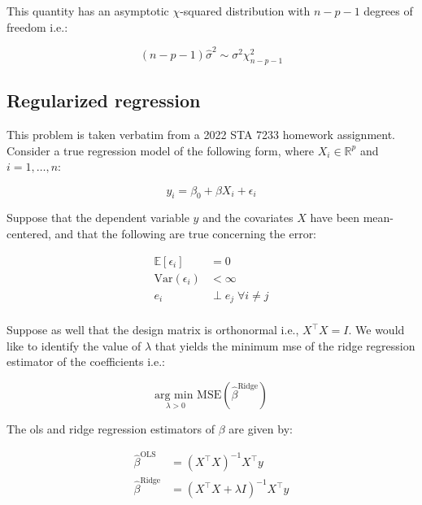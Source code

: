 \documentclass{report}
\begin{document}
This quantity has an asymptotic $\chi$-squared distribution with $n - p - 1$ degrees of freedom i.e.:

\begin{equation}\label{eq:ex-ols-sigma-squared-unbiased-asymptotics}
    (n - p - 1)\hat{\sigma}^2 \sim \sigma^2\chi^2_{n-p-1}
\end{equation}

\subsection{Regularized regression}

This problem is taken verbatim from a 2022 STA 7233 homework assignment. Consider a true regression model of the following form, where $X_i \in \mathbb{R}^p$ and $i = 1, \dots, n$:

\begin{equation}\label{eq:ex-ridge-model-form}
    y_i = \beta_0 + \beta X_i + \epsilon_i
\end{equation}

Suppose that the dependent variable $y$ and the covariates $X$ have been mean-centered, and that the following are true concerning the error:

\begin{equation}\label{eq:ex-ridge-model-assumptions}
    \begin{aligned}
        \mathbb{E}[\epsilon_i] &= 0 \\
        \text{Var}(\epsilon_i) &< \infty \\
        e_i &\perp e_j\; \forall i \neq j \\
    \end{aligned}
\end{equation}

Suppose as well that the design matrix is orthonormal i.e., $X^\intercal X = I$. We would like to identify the value of $\lambda$ that yields the minimum \gls{mse} of the ridge regression estimator of the coefficients i.e.:

\begin{equation}\label{eq:ex-ridge-minimization-problem}
    \underset{\lambda>0}{\text{arg min }}\text{MSE}\left(\hat{\beta}^{\text{Ridge}}\right)
\end{equation}

The \gls{ols} and ridge regression estimators of $\beta$ are given by:

\begin{equation}\label{eq:ex-ridge-beta-ests}
    \begin{aligned}
        \hat{\beta}^{\text{OLS}} &= \left(X^\intercal X\right)^{-1} X^\intercal y \\
        \hat{\beta}^{\text{Ridge}} &= \left(X^\intercal X + \lambda I\right)^{-1} X^\intercal y \\
    \end{aligned}
\end{equation}
\end{document}
